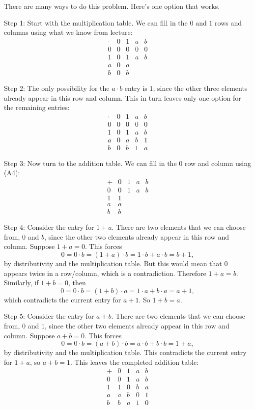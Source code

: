 \documentclass[12pt]{article}
\newenvironment{solutionbox}[1]{%
  \begin{tcolorbox}[
    enhanced,
    breakable,
    colback=solgreen,
    colframe=green!45!black,
    fonttitle=\bfseries,
    title={#1}
  ]
}{%
  \end{tcolorbox}
}
\begin{document}
\newpage
\begin{solutionbox}{Official Solution (Professor)}
There are many ways to do this problem. Here's one option that works.

Step 1: Start with the multiplication table. We can fill in the \(0\) and \(1\) rows and columns using what we know from lecture:
\[
\begin{array}{c|cccc}
\cdot&0&1&a&b\\ \hline
0&0&0&0&0\\
1&0&1&a&b\\
a&0&a&&\\
b&0&b&&
\end{array}
\]

Step 2: The only possibility for the \(a\cdot b\) entry is \(1\), since the other three elements already appear in this row and column. This in turn leaves only one option for the remaining entries:
\[
\begin{array}{c|cccc}
\cdot&0&1&a&b\\ \hline
0&0&0&0&0\\
1&0&1&a&b\\
a&0&a&b&1\\
b&0&b&1&a
\end{array}
\]

Step 3: Now turn to the addition table. We can fill in the \(0\) row and column using (A4):
\[
\begin{array}{c|cccc}
+&0&1&a&b\\ \hline
0&0&1&a&b\\
1&1&&&\\
a&a&&&\\
b&b&&&
\end{array}
\]

Step 4: Consider the entry for \(1+a\). There are two elements that we can choose from, \(0\) and \(b\), since the other two elements already appear in this row and column. Suppose \(1+a=0\). This forces
\[
  0=0\cdot b=(1+a)\cdot b=1\cdot b+a\cdot b=b+1,
\]
by distributivity and the multiplication table. But this would mean that \(0\) appears twice in a row/column, which is a contradiction. Therefore \(1+a=b\). Similarly, if \(1+b=0\), then
\[
  0=0\cdot b=(1+b)\cdot a=1\cdot a+b\cdot a=a+1,
\]
which contradicts the current entry for \(a+1\). So \(1+b=a\).

Step 5: Consider the entry for \(a+b\). There are two elements that we can choose from, \(0\) and \(1\), since the other two elements already appear in this row and column. Suppose \(a+b=0\). This forces
\[
  0=0\cdot b=(a+b)\cdot b=a\cdot b+b\cdot b=1+a,
\]
by distributivity and the multiplication table. This contradicts the current entry for \(1+a\), so \(a+b=1\). This leaves the completed addition table:
\[
\begin{array}{c|cccc}
+&0&1&a&b\\ \hline
0&0&1&a&b\\
1&1&0&b&a\\
a&a&b&0&1\\
b&b&a&1&0
\end{array}
\]
\end{solutionbox}
\end{document}
